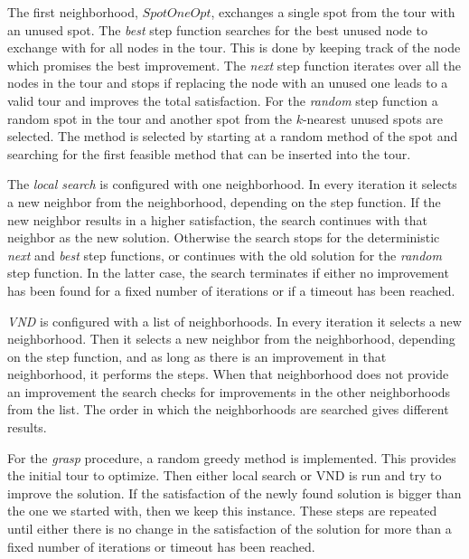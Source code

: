 \documentclass{article}
\begin{document}

The first neighborhood, $SpotOneOpt$, exchanges a single spot from the tour with an unused spot. 
The \emph{best} step function searches for the best unused node to exchange with for all nodes in the tour.
This is done by keeping track of the node which promises the best improvement. %
The \emph{next} step function iterates over all the nodes in the tour and stops if replacing the node with an unused one leads to a valid
tour and improves the total satisfaction. 
For the \emph{random} step function a random spot in the tour and another spot from the $k$-nearest unused spots are selected. 
The method is selected by starting at a random method of the spot and searching for the first feasible method that can be inserted into the
tour.
\medskip

The \emph{local search} is configured with one neighborhood. In every iteration it selects a new neighbor from the neighborhood, depending on the
step function. If the new neighbor results in a higher satisfaction, the search continues with that neighbor as the new solution. Otherwise
the search stops for the deterministic \emph{next} and \emph{best} step functions, or continues with the old solution for the \emph{random}
step function. In the latter case, the search terminates if either no improvement has been found for a fixed number of iterations or if a
timeout has been reached.
\medskip

\emph{VND} is configured with a list of neighborhoods.  In every iteration it selects a new neighborhood. Then it selects a new neighbor from the neighborhood, depending on the step function, and as long as there is an improvement in that neighborhood, it performs the steps. When that neighborhood does not provide an improvement the search checks for improvements in the other neighborhoods from the list. The order in which the neighborhoods are searched gives different results.  

For the \emph{grasp} procedure, a random greedy method is implemented. This provides the initial tour to optimize. Then either local search or VND is run and try to improve the solution. If the satisfaction of the newly found solution is bigger than the one we started with, then we keep this instance. These steps are repeated until either there is no change in the satisfaction of the solution for more than a fixed number of iterations or timeout has been reached.  
\end{document}
